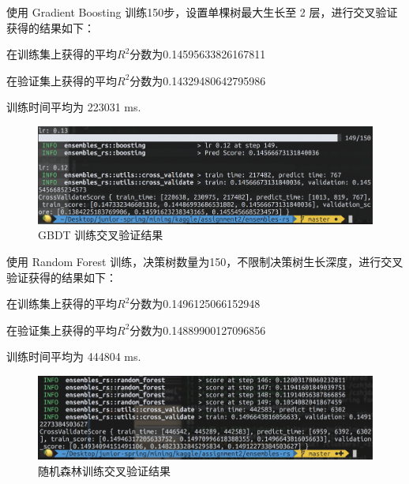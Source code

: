 \documentclass[12pt]{article}
\begin{document}
使用 Gradient Boosting 训练150步，设置单棵树最大生长至 2 层，进行交叉验证获得的结果如下：

在训练集上获得的平均$R^2$分数为0.14595633826167811

在验证集上获得的平均$R^2$分数为0.14329480642795986

训练时间平均为 223031 ms.

\begin{figure}[H]
    \centering
    \includegraphics[scale=0.6]{gbdt-cv.png}
    \caption{GBDT 训练交叉验证结果}
    \label{}
\end{figure}

使用 Random Forest 训练，决策树数量为150，不限制决策树生长深度，进行交叉验证获得的结果如下：

在训练集上获得的平均$R^2$分数为0.1496125066152948

在验证集上获得的平均$R^2$分数为0.14889900127096856

训练时间平均为 444804 ms.

\begin{figure}[H]
    \centering
    \includegraphics[scale=0.6]{rf-cv.png}
    \caption{随机森林训练交叉验证结果}
    \label{}
\end{figure}
\end{document}
